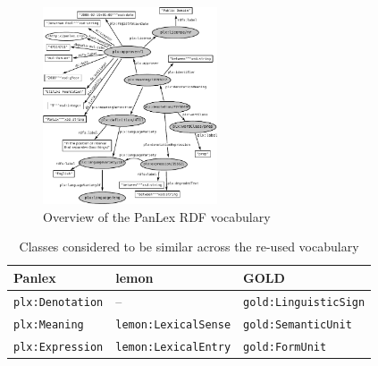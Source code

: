 \documentclass[sw]{iosart2c}
\begin{document}
\begin{figure}
\includegraphics[width=0.46\textwidth]{images/pdf/ontology.pdf}
\caption{Overview of the PanLex RDF vocabulary}
\label{fig:vocabulary}
\end{figure}

\begin{table}
  \centering\begin{scriptsize}
  \begin{tabular}{p{48px}p{62px}p{70px}}
    Panlex                  & lemon                       & GOLD \\
    \midrule
    \texttt{plx:Denotation} & --                          & \texttt{gold:LinguisticSign} \\
    \texttt{plx:Meaning}    & \texttt{lemon:LexicalSense} & \texttt{gold:SemanticUnit} \\
    \texttt{plx:Expression} & \texttt{lemon:LexicalEntry} & \texttt{gold:FormUnit} \\
  \end{tabular}
  \end{scriptsize}
  \caption{Classes considered to be similar across the re-used vocabulary}
  \label{tbl:sameclasses}
\end{table}
\end{document}
